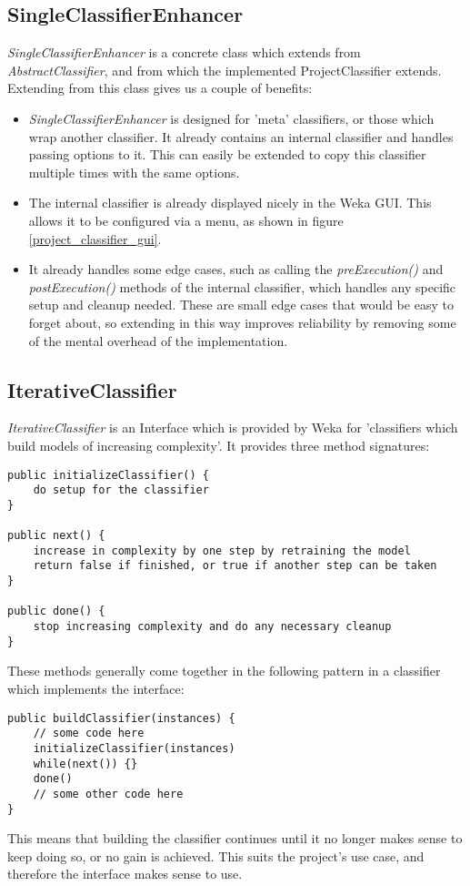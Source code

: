 \subsection{SingleClassifierEnhancer}
\textit{SingleClassifierEnhancer} is a concrete class which extends from \textit{AbstractClassifier}, and from which the implemented ProjectClassifier extends. Extending from this class gives us a couple of benefits:
\begin{itemize}
\item \textit{SingleClassifierEnhancer} is designed for 'meta' classifiers, or those which wrap another classifier. It already contains an internal classifier and handles passing options to it. This can easily be extended to copy this classifier multiple times with the same options.
\item The internal classifier is already displayed nicely in the Weka GUI. This allows it to be configured via a menu, as shown in figure \ref{project_classifier_gui}.
\item It already handles some edge cases, such as calling the \textit{preExecution()} and \textit{postExecution()} methods of the internal classifier, which handles any specific setup and cleanup needed. These are small edge cases that would be easy to forget about, so extending in this way improves reliability by removing some of the mental overhead of the implementation.
\end{itemize}

\subsection{IterativeClassifier}
\textit{IterativeClassifier} is an Interface which is provided by Weka for 'classifiers which build models of increasing complexity'. It provides three method signatures: 
\begin{footnotesize}
\begin{verbatim}
public initializeClassifier() {
    do setup for the classifier
}

public next() {
    increase in complexity by one step by retraining the model
    return false if finished, or true if another step can be taken
}

public done() {
    stop increasing complexity and do any necessary cleanup
}
\end{verbatim}
\end{footnotesize}
These methods generally come together in the following pattern in a classifier which implements the interface:
\begin{footnotesize}
\begin{verbatim}
public buildClassifier(instances) {
    // some code here 
    initializeClassifier(instances)
    while(next()) {}
    done()
    // some other code here
}
\end{verbatim}
\end{footnotesize}
This means that building the classifier continues until it no longer makes sense to keep doing so, or no gain is achieved. This suits the project's use case, and therefore the interface makes sense to use.

